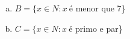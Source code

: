 \documentclass[a4paper,14pt]{article}
\begin{document}
\begin{multicols}{2}
\begin{enumerate}
\begin{enumerate}[a)]
    			\item $B = \{x \in N : x~$é menor que 7\}
    			\item $C = \{x \in N : x~$é primo e par\}
    		\end{enumerate}
    	\end{enumerate}
    $~$ \\ $~$ \\ $~$ \\ $~$ \\ $~$ \\ $~$ \\ $~$ \\ $~$ \\ $~$ \\ $~$ \\ $~$ \\ $~$ \\ $~$ \\ $~$ \\ $~$ \\ $~$ \\ $~$ \\ $~$ \\ $~$ \\ $~$ \\ $~$ \\ $~$ \\ $~$ \\ $~$ \\ $~$ \\ $~$ \\ $~$ \\ $~$ \\ $~$ \\ $~$ \\
	\end{multicols}
\end{document}
